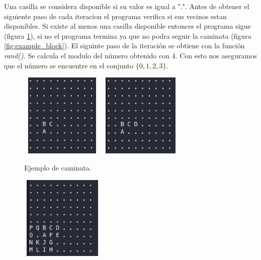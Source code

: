 Una casilla se considera disponible si su valor es igual a ".". Antes de obtener el siguiente paso de cada iteracion el programa verifica si sus vecinos estan disponibles. Si existe al menos una casilla disponible entonces el programa sigue (figura \ref{fig:example_walk}), si no el programa termina ya que no podra seguir la caminata (figura \ref{fig:example_block}). El siguinte paso de la iteración se obtiene con la función \textit{rand()}. Se calcula el modulo del número obtenido con 4. Con esto nos aseguramos que el número se encuentre en el conjunto $\{0, 1, 2 ,3\}$.
\begin{center}
    \begin{minipage}{0.48\linewidth}
        \begin{figure}[H]
            \centering
            \includegraphics[width=4cm,height=4cm]{Graphics/example_2_1_problem1.png}
            \includegraphics[width=4cm,height=4cm]{Graphics/example_2_2_problem1.png}
            \caption{Ejemplo de caminata.}
            \label{fig:example_walk}
        \end{figure}
    \end{minipage}
    \begin{minipage}{0.48\linewidth}
        \begin{figure}[H]
            \centering
            \includegraphics[width=4cm,height=4cm]{Graphics/example_3_1_problem1.png}

\end{figure}
\end{minipage}
\end{center}
